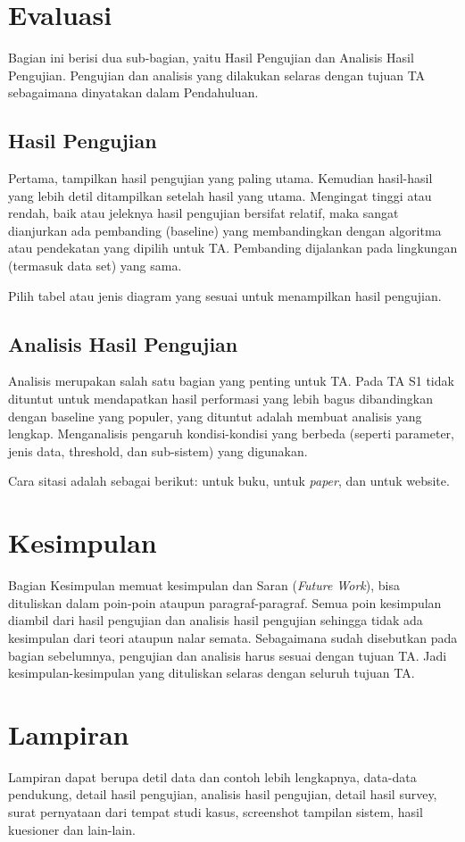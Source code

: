 \section{Evaluasi}

Bagian ini berisi dua sub-bagian, yaitu Hasil Pengujian dan Analisis Hasil Pengujian. Pengujian dan analisis yang dilakukan selaras dengan tujuan TA sebagaimana dinyatakan dalam Pendahuluan.

\subsection{Hasil Pengujian}

Pertama, tampilkan hasil pengujian yang paling utama. Kemudian hasil-hasil yang lebih detil ditampilkan setelah hasil yang utama. Mengingat tinggi atau rendah, baik atau jeleknya hasil pengujian bersifat relatif, maka sangat dianjurkan ada pembanding (baseline) yang membandingkan dengan algoritma atau pendekatan yang dipilih untuk TA. Pembanding dijalankan pada lingkungan (termasuk data set) yang sama.

Pilih tabel atau jenis diagram yang sesuai untuk menampilkan hasil pengujian. 


\subsection{Analisis Hasil Pengujian}
 Analisis merupakan salah satu bagian yang penting untuk TA. Pada TA S1 tidak dituntut untuk mendapatkan hasil performasi yang lebih bagus dibandingkan dengan baseline yang populer, yang dituntut adalah membuat analisis yang lengkap. Menganalisis pengaruh kondisi-kondisi yang berbeda (seperti parameter, jenis data, threshold, dan sub-sistem) yang digunakan. 
 
 Cara sitasi adalah sebagai berikut: \citep{van2002fundamentals} untuk buku, \citep{ochoa2003hybrid} untuk \textit{paper}, dan \citep{Budi} untuk website.
   
   
\section{Kesimpulan}
 \noindent Bagian Kesimpulan memuat kesimpulan dan Saran (\textit{Future Work}), bisa dituliskan dalam poin-poin ataupun paragraf-paragraf. Semua poin kesimpulan diambil dari hasil pengujian dan analisis hasil pengujian sehingga tidak ada kesimpulan dari teori ataupun nalar semata. Sebagaimana sudah disebutkan pada bagian sebelumnya, pengujian dan analisis harus sesuai dengan tujuan TA. Jadi kesimpulan-kesimpulan yang dituliskan selaras dengan seluruh tujuan TA. 
 





\section*{Lampiran}

\noindent Lampiran dapat berupa detil data dan contoh lebih lengkapnya, data-data pendukung, detail hasil pengujian, analisis hasil pengujian, detail hasil survey, surat pernyataan dari tempat studi kasus, screenshot tampilan sistem, hasil kuesioner dan lain-lain.